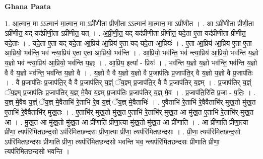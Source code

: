 \documentclass[17pt]{extarticle}
\begin{document}
\textbf{Ghana Paata } \newline

1. आ॒त्मान॒ मा ऽऽत्मान॑ मा॒त्मान॒ मा ऽप्री॑णीता प्रीणी॒ता ऽऽत्मान॑ मा॒त्मान॒ मा ऽप्री॑णीत । . आ ऽप्री॑णीता प्रीणी॒ता ऽप्री॑णीत॒ यद् यद॑प्रीणी॒ता ऽप्री॑णीत॒ यत् । . अ॒प्री॒णी॒त॒ यद् यद॑प्रीणीता प्रीणीत॒ यदे॒ता ए॒ता यद॑प्रीणीता प्रीणीत॒ यदे॒ताः । . यदे॒ता ए॒ता यद् यदे॒ता आ॒प्रिय॑ आ॒प्रिय॑ ए॒ता यद् यदे॒ता आ॒प्रियः॑ । . ए॒ता आ॒प्रिय॑ आ॒प्रिय॑ ए॒ता ए॒ता आ॒प्रियो॒ भव॑न्ति॒ भव॑ न्त्या॒प्रिय॑ ए॒ता ए॒ता आ॒प्रियो॒ भव॑न्ति । . आ॒प्रियो॒ भव॑न्ति॒ भव॑ न्त्या॒प्रिय॑ आ॒प्रियो॒ भव॑न्ति य॒ज्ञो य॒ज्ञो भव॑ न्त्या॒प्रिय॑ आ॒प्रियो॒ भव॑न्ति य॒ज्ञ्ः । . आ॒प्रिय॒ इत्या᳚ - प्रियः॑ । . भव॑न्ति य॒ज्ञो य॒ज्ञो भव॑न्ति॒ भव॑न्ति य॒ज्ञो वै वै य॒ज्ञो भव॑न्ति॒ भव॑न्ति य॒ज्ञो वै । . य॒ज्ञो वै वै य॒ज्ञो य॒ज्ञो वै प्र॒जाप॑तिः प्र॒जाप॑ति॒र् वै य॒ज्ञो य॒ज्ञो वै प्र॒जाप॑तिः । . वै प्र॒जाप॑तिः प्र॒जाप॑ति॒र् वै वै प्र॒जाप॑तिर् य॒ज्ञ्ं ॅय॒ज्ञ्म् प्र॒जाप॑ति॒र् वै वै प्र॒जाप॑तिर् य॒ज्ञ्म् । . प्र॒जाप॑तिर् य॒ज्ञ्ं ॅय॒ज्ञ्म् प्र॒जाप॑तिः प्र॒जाप॑तिर् य॒ज्ञ् मे॒वैव य॒ज्ञ्म् प्र॒जाप॑तिः प्र॒जाप॑तिर् य॒ज्ञ् मे॒व । . प्र॒जाप॑ति॒रिति॑ प्र॒जा - प॒तिः॒ । . य॒ज्ञ् मे॒वैव य॒ज्ञ्ं ॅय॒ज्ञ् मे॒वैताभि॑ रे॒ताभि॑ रे॒व य॒ज्ञ्ं ॅय॒ज्ञ् मे॒वैताभिः॑ । . ए॒वैताभि॑ रे॒ताभि॑ रे॒वैवैताभि॑र् मुख॒तो मु॑ख॒त ए॒ताभि॑ रे॒वैवैताभि॑र् मुख॒तः । . ए॒ताभि॑र् मुख॒तो मु॑ख॒त ए॒ताभि॑ रे॒ताभि॑र् मुख॒त आ मु॑ख॒त ए॒ताभि॑ रे॒ताभि॑र् मुख॒त आ । . मु॒ख॒त आ मु॑ख॒तो मु॑ख॒त आ प्री॑णाति प्रीणा॒त्या मु॑ख॒तो मु॑ख॒त आ प्री॑णाति । . आ प्री॑णाति प्रीणा॒त्या प्री॑णा॒ त्यप॑रिमितछन्द॒सो ऽप॑रिमितछन्दसः प्रीणा॒त्या प्री॑णा॒ त्यप॑रिमितछन्दसः । . प्री॒णा॒ त्यप॑रिमितछन्द॒सो ऽप॑रिमितछन्दसः प्रीणाति प्रीणा॒ त्यप॑रिमितछन्दसो भवन्ति भव॒ न्त्यप॑रिमितछन्दसः प्रीणाति प्रीणा॒ त्यप॑रिमितछन्दसो भवन्ति । \newline
\end{document}

